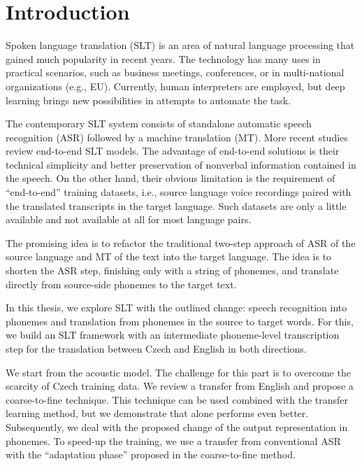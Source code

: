 \chapter*{Introduction}

Spoken language translation (SLT) is an area of natural language processing that gained much popularity in recent years. The technology has many uses in practical scenarios, such as business meetings, conferences, or in multi-national organizations (e.g., EU). Currently, human interpreters are employed, but deep learning brings new possibilities in attempts to automate the task.

The contemporary SLT system consists of standalone automatic speech recognition (ASR) followed by a machine translation (MT). More recent studies review end-to-end SLT models. The advantage of end-to-end solutions is their technical simplicity and better preservation of nonverbal information contained in the speech. On the other hand, their obvious limitation is the requirement of ``end-to-end'' training datasets, i.e., source language voice recordings paired with the translated transcripts in the target language. Such datasets are only a little available and not available at all for most language pairs.

The promising idea is to refactor the traditional two-step approach of ASR of the source language and MT of the text into the target language. The idea is to shorten the ASR step, finishing only with a string of phonemes, and translate directly from source-side phonemes to the target text.

In this thesis, we explore SLT with the outlined change: speech recognition into phonemes and translation from phonemes in the source to target words. For this, we build an SLT framework with an intermediate phoneme-level transcription step for the translation between Czech and English in both directions. 

We start from the acoustic model. The challenge for this part is to overcome the scarcity of Czech training data. We review a transfer from English and propose a coarse-to-fine technique. This technique can be used combined with the transfer learning method, but we demonstrate that alone performs even better. Subsequently, we deal with the proposed change of the output representation in phonemes. To speed-up the training, we use a transfer from conventional ASR with the ``adaptation phase'' proposed in the coarse-to-fine method.

